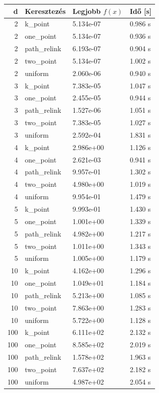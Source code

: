 \begin{tabular}{rlll}
d & Keresztezés & Legjobb $f(x)$ & Idő [s] \\
\hline
2 & k\_point & 5.134e-07 & 0.986 s \\
2 & one\_point & 5.134e-07 & 0.936 s \\
2 & path\_relink & 6.193e-07 & 0.904 s \\
2 & two\_point & 5.134e-07 & 1.002 s \\
2 & uniform & 2.060e-06 & 0.940 s \\
3 & k\_point & 7.383e-05 & 1.047 s \\
3 & one\_point & 2.455e-05 & 0.944 s \\
3 & path\_relink & 1.527e-06 & 1.051 s \\
3 & two\_point & 7.383e-05 & 1.027 s \\
3 & uniform & 2.592e-04 & 1.831 s \\
4 & k\_point & 2.986e+00 & 1.126 s \\
4 & one\_point & 2.621e-03 & 0.941 s \\
4 & path\_relink & 9.957e-01 & 1.302 s \\
4 & two\_point & 4.980e+00 & 1.019 s \\
4 & uniform & 9.954e-01 & 1.479 s \\
5 & k\_point & 9.993e-01 & 1.430 s \\
5 & one\_point & 1.001e+00 & 1.339 s \\
5 & path\_relink & 4.982e+00 & 1.217 s \\
5 & two\_point & 1.011e+00 & 1.343 s \\
5 & uniform & 1.005e+00 & 1.179 s \\
10 & k\_point & 4.162e+00 & 1.296 s \\
10 & one\_point & 1.049e+01 & 1.184 s \\
10 & path\_relink & 5.213e+00 & 1.085 s \\
10 & two\_point & 7.863e+00 & 1.283 s \\
10 & uniform & 5.722e+00 & 1.128 s \\
100 & k\_point & 6.111e+02 & 2.132 s \\
100 & one\_point & 8.585e+02 & 2.019 s \\
100 & path\_relink & 1.578e+02 & 1.963 s \\
100 & two\_point & 7.637e+02 & 2.182 s \\
100 & uniform & 4.987e+02 & 2.054 s \\
\end{tabular}
